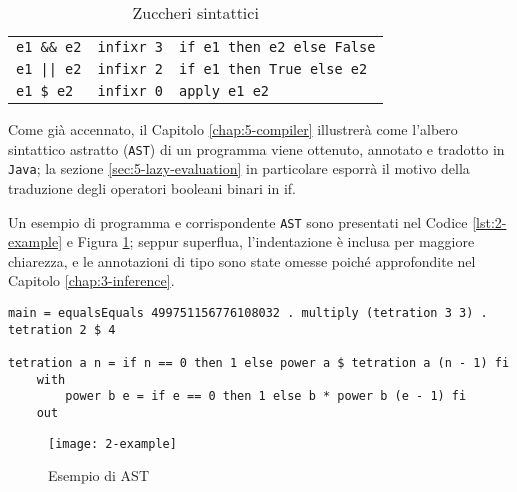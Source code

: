 \begin{table}[H]
\begin{center}
\begin{tabularx}{\textwidth}{|p{8em}@{\quad}p{7em}|X|}
            \texttt{e1 \&\& e2}          & \texttt{infixr 3} & \texttt{if e1 then e2 else False} \\
            \texttt{e1 || e2}            & \texttt{infixr 2} & \texttt{if e1 then True else e2}  \\
            \texttt{e1 \$ e2}            & \texttt{infixr 0} & \texttt{apply e1 e2}              \\
            \hline
        \end{tabularx}
    \end{center}
    \caption{Zuccheri sintattici}
    \label{tab:2-sugar}
\end{table}

\newpage

\noindent Come già accennato, il Capitolo \ref{chap:5-compiler} illustrerà come l'albero sintattico astratto (\texttt{AST})
di un programma viene ottenuto, annotato e tradotto in \texttt{Java}; la sezione \ref{sec:5-lazy-evaluation}
in particolare esporrà il motivo della traduzione degli operatori booleani binari in if.

\noindent Un esempio di programma e corrispondente \texttt{AST} sono presentati nel Codice \ref{lst:2-example} e Figura \ref{fig:2-example};
seppur superflua, l'indentazione è inclusa per maggiore chiarezza,
e le annotazioni di tipo sono state omesse poiché approfondite nel Capitolo \ref{chap:3-inference}.

\vspace{8mm}
\begin{lstlisting}[caption={Esempio di programma}, style=funxCode, label={lst:2-example}]
main = equalsEquals 499751156776108032 . multiply (tetration 3 3) . tetration 2 $ 4

tetration a n = if n == 0 then 1 else power a $ tetration a (n - 1) fi
    with
        power b e = if e == 0 then 1 else b * power b (e - 1) fi
    out
\end{lstlisting}

\begin{figure}[H]
    \centering
    \vspace{8mm}
    \texttt{[image: 2-example]}
    \caption{Esempio di AST}
    \label{fig:2-example}
\end{figure}